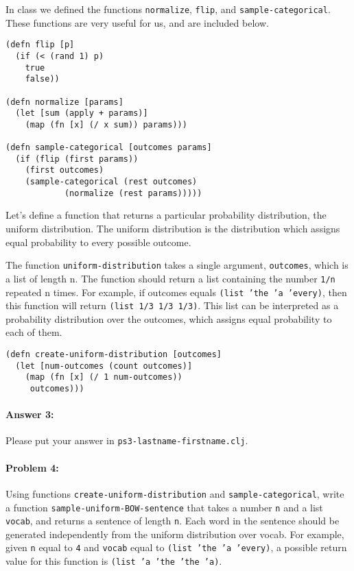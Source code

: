 \documentclass[10pt]{article}
\newcommand{\PSnum}{3}
\begin{document}
In class we defined the functions \texttt{normalize}, \texttt{flip},
and \texttt{sample-categorical}. These functions are very useful for
us, and are included below.

\begin{lstlisting}
(defn flip [p]
  (if (< (rand 1) p)
    true
    false))

(defn normalize [params]
  (let [sum (apply + params)]
    (map (fn [x] (/ x sum)) params)))

(defn sample-categorical [outcomes params]
  (if (flip (first params))
    (first outcomes)
    (sample-categorical (rest outcomes) 
			(normalize (rest params)))))
\end{lstlisting}

Let's define a function that returns a particular probability
distribution, the uniform distribution. The uniform distribution is
the distribution which assigns equal probability to every possible
outcome.
  
The function \texttt{uniform-distribution} takes a single argument,
\texttt{outcomes}, which is a list of length n. The function should
return a list containing the number \texttt{1/n} repeated n times. For
example, if outcomes equals \texttt{(list 'the 'a 'every)}, then this
function will return \texttt{(list 1/3 1/3 1/3)}. This list can be
interpreted as a probability distribution over the outcomes, which
assigns equal probability to each of them.

\begin{lstlisting}
(defn create-uniform-distribution [outcomes]
  (let [num-outcomes (count outcomes)]
    (map (fn [x] (/ 1 num-outcomes))
	 outcomes)))
\end{lstlisting}

\paragraph{Answer 3:} Please put your answer in \texttt{ps\PSnum-lastname-firstname.clj}.

\noindent\hrulefill %

\paragraph{Problem 4:}

Using functions \texttt{create-uniform-distribution} and
\texttt{sample-categorical}, write a function
\texttt{sample-uniform-BOW-sentence} that takes a number \texttt{n}
and a list \texttt{vocab}, and returns a sentence of length
\texttt{n}. Each word in the sentence should be generated
independently from the uniform distribution over vocab. For example,
given \texttt{n} equal to \texttt{4} and \texttt{vocab} equal to
\texttt{(list 'the 'a 'every)}, a possible return value for this
function is \texttt{(list 'a 'the 'the 'a)}.
\end{document}
